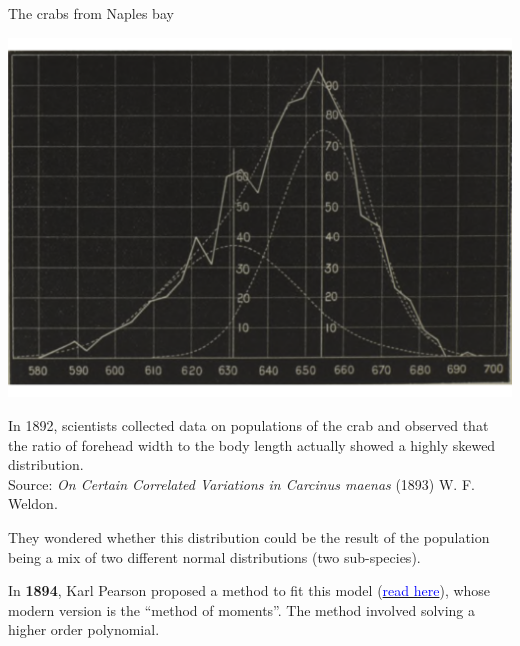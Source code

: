 \documentclass[11pt,handout,aspectratio=169]{beamer}
\begin{document}
\begin{frame}{The crabs from Naples bay}


\begin{minipage}{5.5cm}{}
	\includegraphics[scale=.29]{pics/crabs.png}
		\end{minipage}\begin{minipage}{9cm}
			 In 1892, scientists collected data on populations of the crab and observed that the ratio of forehead width to the body length  actually showed a highly skewed distribution.\\[2mm] {\small Source: \textit{On Certain Correlated Variations in Carcinus maenas} (1893) W. F.  Weldon.}	
		\end{minipage}

{ They wondered whether this distribution could be the result of the population being a mix of two different normal distributions (two sub-species).}
\smallskip 

{ In \textbf{1894}, Karl Pearson proposed a method to fit this model (\href{https://archive.org/details/philtrans02543681}{\textcolor{blue}{read here}}), whose modern version is the ``method of moments''. The method involved solving a higher order polynomial.}
\end{frame}
\end{document}
